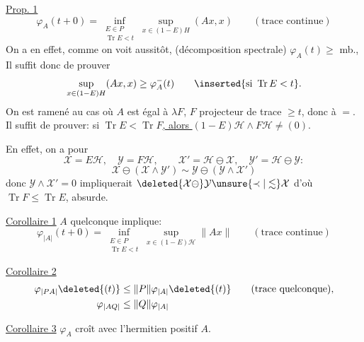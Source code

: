 
\uline{Prop. 1}
\[
\varphi_A(t+0)=
\inf_{\substack{E\in P\\\operatorname{Tr}E<t}}
\sup_{x\in(1-E)H}(Ax,x)
\qquad(\text{trace continue})
\]
On a en effet, comme on voit aussitôt, (décomposition spectrale)
$\varphi_A(t)\geq$  mb., Il suffit donc de prouver
\[
\sup_{x\in(1-E)H}(Ax,x)\geq\varphi_A^-(t)
\qquad\inserted{\text{si }\operatorname{Tr}E<t}.
\]
On est ramené au cas où $A$ est égal à $\lambda F$, $F$ projecteur de trace $\geq t$, donc à  $=$.
Il suffit de prouver: si \uline{$\operatorname{Tr}E<\operatorname{Tr}F$, alors $(1-E)\mathcal H\wedge F\mathcal H\ne(0)$}.

En effet, on a  pour
\[
\mathcal X=E\mathcal H,\quad\mathcal Y=F\mathcal H,\qquad
\mathcal X'=\mathcal H\ominus\mathcal X,\quad
\mathcal Y'=\mathcal H\ominus\mathcal Y:
\]
\[
\mathcal X\ominus(\mathcal X\wedge\mathcal Y')\sim
\mathcal Y\ominus(\mathcal Y\wedge\mathcal X')
\]
donc $\mathcal Y\wedge\mathcal X'=0$ impliquerait
$\deleted{\mathcal X\ominus}\mathcal Y\unsure{\prec|\lesssim}\mathcal X$
d'où $\operatorname{Tr}F\leq\operatorname{Tr}E$, absurde.

\uline{Corollaire 1} $A$ quelconque implique:
\[
\varphi_{|A|}(t+0)=\inf_{\substack{E\in P\\\operatorname{Tr}E<t}}
\sup_{x\in(1-E)\mathcal H}\|Ax\|
\qquad(\text{trace continue})
\]

\uline{Corollaire 2}
\[
\begin{aligned}
\varphi_{|PA|}\deleted{(t)}&\leq\|P\|\varphi_{|A|}\deleted{(t)}
\qquad(\text{trace quelconque}),\\
\varphi_{|AQ|}&\leq\|Q\|\varphi_{|A|}
\end{aligned}
\]

\uline{Corollaire 3} $\varphi_A$ croît avec l'hermitien positif $A$.

